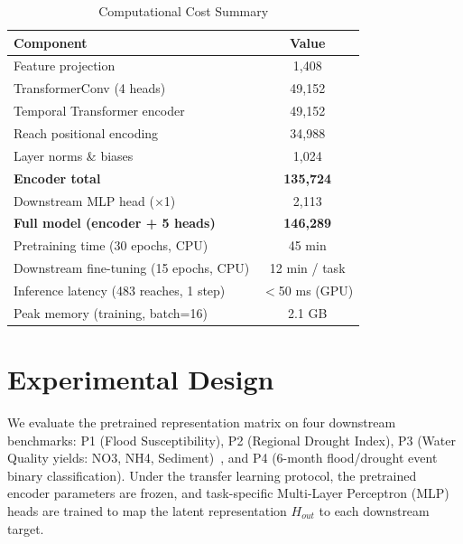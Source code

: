 \documentclass[preprint,12pt]{elsarticle}
\begin{document}
\begin{table}[H]
\centering
\caption{Computational Cost Summary}\label{tab:compute}
\begin{tabular}{lc}
\toprule
Component & Value \\
\midrule
Feature projection & 1,408 \\
TransformerConv (4 heads) & 49,152 \\
Temporal Transformer encoder & 49,152 \\
Reach positional encoding & 34,988 \\
Layer norms \& biases & 1,024 \\
\textbf{Encoder total} & \textbf{135,724} \\
\midrule
Downstream MLP head ($\times$1) & 2,113 \\
\textbf{Full model (encoder + 5 heads)} & \textbf{146,289} \\
\midrule
Pretraining time (30 epochs, CPU) & 45 min \\
Downstream fine-tuning (15 epochs, CPU) & 12 min / task \\
Inference latency (483 reaches, 1 step) & $<$50 ms (GPU) \\
Peak memory (training, batch=16) & 2.1 GB \\
\bottomrule
\end{tabular}
\end{table}

\section{Experimental Design}
We evaluate the pretrained representation matrix on four downstream benchmarks: P1 (Flood Susceptibility), P2 (Regional Drought Index), P3 (Water Quality yields: NO3, NH4, Sediment)~\citep{moriasi2015validation}, and P4 (6-month flood/drought event binary classification). Under the transfer learning protocol, the pretrained encoder parameters are frozen, and task-specific Multi-Layer Perceptron (MLP) heads are trained to map the latent representation $H_{out}$ to each downstream target.
\end{document}
